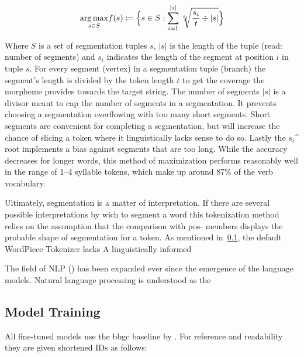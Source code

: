 \begin{equation}\label{eq:maximization}
    \underset{s \in S}{\arg\max} f(s) \coloneqq  \Bigl\{ s \in S : \sum_{i=1}^{|s|} \sqrt[s_{i}]{\frac{s_{i}}{t} \div |s|}\Bigr\}
\end{equation}

Where $S$ is a set of segmentation tuples $s$, $|s|$ is the length of the tuple (read: number of segments) and $s_{i}$ indicates the length of the segment at position $i$ in tuple $s$.
For every segment (vertex) in a segmentation tuple (branch)  the segment's length is divided by the token length $t$ to get the coverage the morpheme provides towards the target string.
The number of segments $|s|$ is a divisor meant to cap the number of segments in a segmentation.
It prevents choosing a segmentation overflowing with too many short segments.
Short segments are convenient for completing a segmentation, but will increase the chance of slicing a token where it linguistically lacks sense to do so.
Lastly the $s_{i}$^{} root implements a bias against segments that are too long.
While the accuracy decreases for longer words, this method of maximization performs reasonably well in the range of 1--4 syllable tokens, which make up around 87\% of the verb vocabulary.


Ultimately, segmentation is a matter of interpretation.
If there are several possible interpretations by wich to segment a word this tokenization method relies on the assumption that the comparison with \ac{pos}- members displays the probable shape of segmentation for a token.
As mentioned in~\ref{subsec:masked-language-model}, the default WordPiece Tokenizer lacks
A linguistically informed



The field of NLP  (\cite{METZLER2016}) has been expanded ever since the emergence of the language models.
Natural language processing is understood as the



\subsection{Model Training}
\label{subsec:masked-language-model}
All fine-tuned models use the \ac{bbgc} baseline by \textcite{bertbasegermancased}.
For reference and readability they are given shortened IDs as follows:\\

